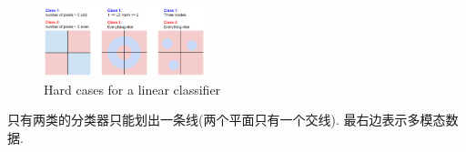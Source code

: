 \begin{figure}[!htb]
    \centering
    \includegraphics[width=0.42\textwidth]{pic/Lec2/Hard cases for a linear classifier}
    \caption{Hard cases for a linear classifier}
\end{figure}
只有两类的分类器只能划出一条线(两个平面只有一个交线). 最右边表示多模态数据. 